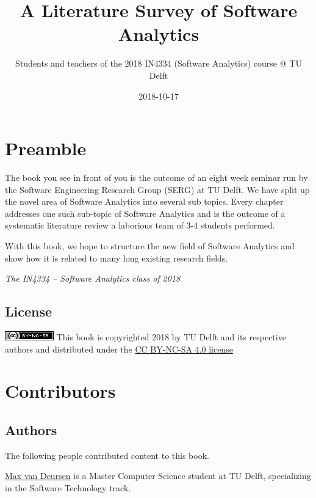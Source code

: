 \documentclass[]{book}
\title{A Literature Survey of Software Analytics}
\author{Students and teachers of the 2018 IN4334 (Software Analytics) course @
TU Delft}
\date{2018-10-17}
\begin{document}
\maketitle

{
\hypersetup{linkcolor=black}
\setcounter{tocdepth}{1}
\tableofcontents
}
\chapter*{Preamble}\label{intro}

The book you see in front of you is the outcome of an eight week seminar
run by the Software Engineering Research Group (SERG) at TU Delft. We
have split up the novel area of Software Analytics into several sub
topics. Every chapter addresses one such sub-topic of Software Analytics
and is the outcome of a systematic literature review a laborious team of
3-4 students performed.

With this book, we hope to structure the new field of Software Analytics
and show how it is related to many long existing research fields.

\emph{The IN4334 -- Software Analytics class of 2018}

\section*{License}\label{license}

\includegraphics{figures/cc-nc-sa.png} This book is copyrighted 2018 by
TU Delft and its respective authors and distributed under the
\href{https://creativecommons.org/licenses/by-nc-sa/4.0/}{CC BY-NC-SA
4.0 license}

\chapter*{Contributors}\label{contributors}

\section*{Authors}\label{authors}

The following people contributed content to this book.

\href{http://maxvandeursen.nl}{Max van Deursen} is a Master Computer
Science student at TU Delft, specializing in the Software Technology
track.
\end{document}
